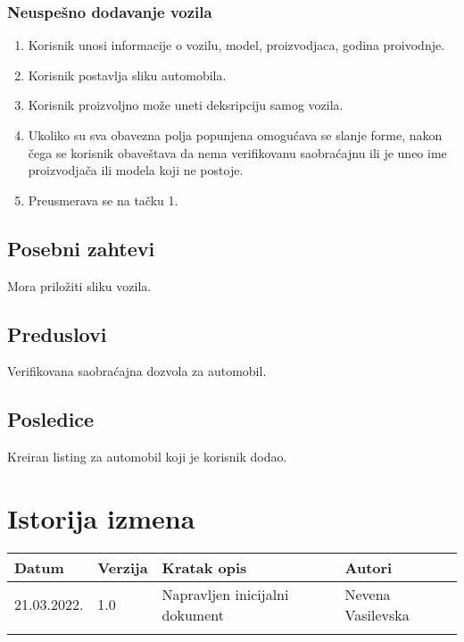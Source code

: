 \documentclass[12pt]{article}
\begin{document}
\subsubsection{Neuspešno dodavanje vozila}

\begin{enumerate}
    \item Korisnik unosi informacije o vozilu, model, proizvodjaca, godina proivodnje.
    \item Korisnik postavlja sliku automobila.
    \item Korisnik proizvoljno može uneti deksripciju samog vozila.
    \item Ukoliko su sva obavezna polja popunjena omogućava se slanje forme, nakon čega se korisnik obaveštava da nema verifikovanu saobraćajnu ili je uneo ime proizvodjača ili modela koji ne postoje.
    \item Preusmerava se na tačku 1.
\end{enumerate}

\subsection{Posebni zahtevi}
Mora priložiti sliku vozila.
\subsection{Preduslovi}
Verifikovana saobraćajna dozvola za automobil.
\subsection{Posledice}
Kreiran listing za automobil koji je korisnik dodao.

\section{Istorija izmena}
\begin{center}
\begin{tabular}{ | m{2cm} | m{1.5cm}| m{6cm} | m{5cm} | } 
\hline
Datum & Verzija & Kratak opis & Autori \\ 
\hline
 21.03.2022. & 1.0 & Napravljen inicijalni dokument & Nevena Vasilevska\\ 
\hline
&&&\\ 
\hline
\end{tabular}
\end{center}
\end{document}
